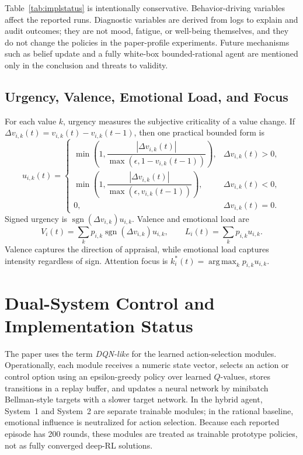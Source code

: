 \documentclass[runningheads]{llncs}
\newcommand{\argmaxop}{\operatorname*{arg\,max}}
\begin{document}
Table~\ref{tab:implstatus} is intentionally conservative. Behavior-driving variables affect the reported runs. Diagnostic variables are derived from logs to explain and audit outcomes; they are not mood, fatigue, or well-being themselves, and they do not change the policies in the paper-profile experiments. Future mechanisms such as belief update and a fully white-box bounded-rational agent are mentioned only in the conclusion and threats to validity.

\subsection{Urgency, Valence, Emotional Load, and Focus}

For each value $k$, urgency measures the subjective criticality of a value change. If $\Delta v_{i,k}(t)=v_{i,k}(t)-v_{i,k}(t-1)$, then one practical bounded form is
\[
u_{i,k}(t)=
\begin{cases}
\min\left(1,\dfrac{|\Delta v_{i,k}(t)|}{\max(\epsilon,1-v_{i,k}(t-1))}\right), & \Delta v_{i,k}(t)>0,\\[7pt]
\min\left(1,\dfrac{|\Delta v_{i,k}(t)|}{\max(\epsilon,v_{i,k}(t-1))}\right), & \Delta v_{i,k}(t)<0,\\[7pt]
0, & \Delta v_{i,k}(t)=0.
\end{cases}
\]
Signed urgency is $\operatorname{sgn}(\Delta v_{i,k})u_{i,k}$. Valence and emotional load are
\[
V_i(t)=\sum_k p_{i,k}\operatorname{sgn}(\Delta v_{i,k})u_{i,k},\qquad
L_i(t)=\sum_k p_{i,k}u_{i,k}.
\]
Valence captures the direction of appraisal, while emotional load captures intensity regardless of sign. Attention focus is $k^*_i(t)=\argmaxop_k p_{i,k}u_{i,k}$.

\section{Dual-System Control and Implementation Status}

The paper uses the term \emph{DQN-like} for the learned action-selection modules. Operationally, each module receives a numeric state vector, selects an action or control option using an epsilon-greedy policy over learned $Q$-values, stores transitions in a replay buffer, and updates a neural network by minibatch Bellman-style targets with a slower target network. In the hybrid agent, System~1 and System~2 are separate trainable modules; in the rational baseline, emotional influence is neutralized for action selection. Because each reported episode has 200 rounds, these modules are treated as trainable prototype policies, not as fully converged deep-RL solutions.
\end{document}
